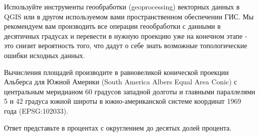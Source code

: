 Используйте инструменты геообработки (geoprocessing) векторных данных в QGIS или в другом используемом вами пространственном обеспечении ГИС.  Мы рекомендуем вам производить все операции геообработки с данными в десятичных градусах и перевести в нужную проекцию уже на конечном этапе - это снизит вероятность того, что дадут о себе знать возможные топологические ошибки исходных данных.

Вычисления площадей производите в равновеликой конической проекции Альберса для Южной Америки (South America Albers Equal Area Conic) с центральным меридианом 60 градусов западной долготы и главными параллелями 5 и 42 градуса южной широты в южно-американской системе координат 1969 года (EPSG:102033).

Ответ представьте в процентах с округлением до десятых долей процента.